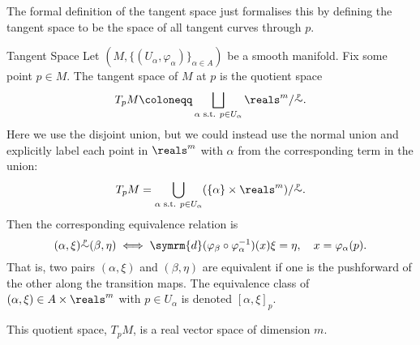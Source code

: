 \documentclass[fleqn]{NotesClass}
\renewcommand{\dl}{\symrm{d}}
\newcommand{\tangrel}[1][p]{\mathrel{\stackrel{\scriptscriptstyle #1}{\sim}}}
\begin{document}
    The formal definition of the tangent space just formalises this by defining the tangent space to be the space of all tangent curves through \(p\).
    
    \begin{dfn}{Tangent Space}{}
        Let \((M, \{(U_\alpha, \varphi_\alpha)\}_{\alpha \in A})\) be a smooth manifold.
        Fix some point \(p \in M\).
        The tangent space of \(M\) at \(p\) is the quotient space
        \begin{equation}
            T_pM \coloneqq \bigsqcup_{\alpha \text{ s.t. }p \in U_\alpha} \reals^m / {\tangrel}.
        \end{equation}
        Here we use the disjoint union, but we could instead use the normal union and explicitly label each point in \(\reals^m\) with \(\alpha\) from the corresponding term in the union:
        \begin{equation}
            T_pM = \bigcup_{\alpha \text{ s.t. } p \in U_\alpha} (\{\alpha\} \times \reals^m)/{\tangrel}.
        \end{equation}
        Then the corresponding equivalence relation is
        \begin{equation}
            (\alpha, \xi) {\tangrel} (\beta, \eta) \iff \dl(\varphi_\beta \circ \varphi_\alpha^{-1})(x)\xi = \eta, \quad x = \varphi_\alpha(p).
        \end{equation}
        That is, two pairs \((\alpha, \xi)\) and \((\beta, \eta)\) are equivalent if one is the pushforward of the other along the transition maps.
        The equivalence class of \((\alpha, \xi) \in A \times \reals^m\) with \(p \in U_\alpha\) is denoted \([\alpha, \xi]_p\).
    \end{dfn}
    
    This quotient space, \(T_pM\), is a real vector space of dimension \(m\).
    
\end{document}
